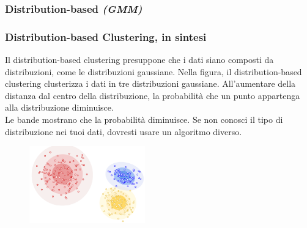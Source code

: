 
\subsubsection[Distribution-based (GMM)]{Distribution-based \textit{(GMM)}}
\begin{frame}

	\frametitle{{\color{GradientDescentDiagramOrange}Distribution-based Clustering}, in sintesi}

		Il distribution-based clustering presuppone che i dati siano composti da distribuzioni, come le distribuzioni gaussiane.
		\newlinedouble
		Nella figura, il distribution-based clustering clusterizza i dati in tre distribuzioni gaussiane.
		All'aumentare della distanza dal centro della distribuzione, la probabilità che un punto appartenga alla distribuzione diminuisce.\\
		Le bande mostrano che la probabilità diminuisce. Se non conosci il tipo di distribuzione nei tuoi dati, dovresti usare un algoritmo diverso.
		\begin{figure}[!htbp]
			\centering
			\includegraphics[width=5.0cm]{images/unsupervised/types/Clustering_Distribution.pdf}
		\end{figure}

\end{frame}


